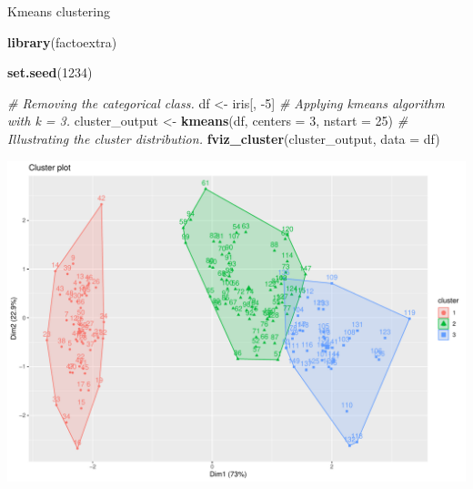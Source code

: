 \documentclass[12pt,ignorenonframetext,]{beamer}
\newenvironment{Shaded}{\begin{snugshade}}{\end{snugshade}}
\newcommand{\CommentTok}[1]{\textcolor[rgb]{0.56,0.35,0.01}{\textit{#1}}}
\newcommand{\DataTypeTok}[1]{\textcolor[rgb]{0.13,0.29,0.53}{#1}}
\newcommand{\DecValTok}[1]{\textcolor[rgb]{0.00,0.00,0.81}{#1}}
\newcommand{\KeywordTok}[1]{\textcolor[rgb]{0.13,0.29,0.53}{\textbf{#1}}}
\newcommand{\NormalTok}[1]{#1}
\newcommand{\StringTok}[1]{\textcolor[rgb]{0.31,0.60,0.02}{#1}}
\begin{document}
\begin{frame}[fragile]{Kmeans clustering}
\protect\hypertarget{kmeans-clustering}{}

\tiny

\begin{Shaded}
\begin{Highlighting}[]
\KeywordTok{library}\NormalTok{(factoextra)}

\KeywordTok{set.seed}\NormalTok{(}\DecValTok{1234}\NormalTok{)}

\CommentTok{# Removing the categorical class.}
\NormalTok{df <-}\StringTok{ }\NormalTok{iris[, }\DecValTok{-5}\NormalTok{]}
\CommentTok{# Applying kmeans algorithm with k = 3.}
\NormalTok{cluster_output <-}\StringTok{ }\KeywordTok{kmeans}\NormalTok{(df, }\DataTypeTok{centers =} \DecValTok{3}\NormalTok{, }\DataTypeTok{nstart =} \DecValTok{25}\NormalTok{)}
\CommentTok{# Illustrating the cluster distribution.}
\KeywordTok{fviz_cluster}\NormalTok{(cluster_output, }\DataTypeTok{data =}\NormalTok{ df)}
\end{Highlighting}
\end{Shaded}

\begin{center}\includegraphics[width=0.6\linewidth,height=0.5\textheight]{figs/unnamed-chunk-16} \end{center}

\normalsize

\end{frame}
\end{document}
